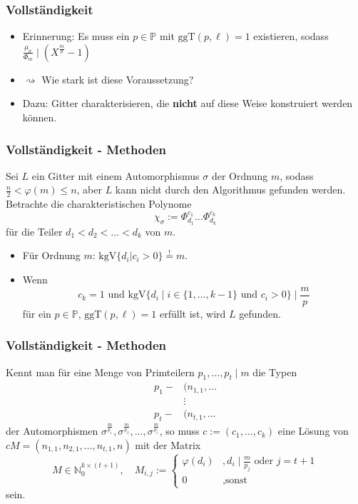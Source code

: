 \documentclass{beamer}
\newcommand{\N}{\mathbb{N}}
\renewcommand{\P}{\mathbb{P}}
\newcommand{\ggT}{\text{ggT}}
\newcommand{\kgV}{\text{kgV}}
\begin{document}
\begin{frame}[plain]
	\frametitle{Vollständigkeit}
	\begin{itemize}
	\item Erinnerung: Es muss ein $p \in \P$ mit $\ggT(p, \ell) = 1$ existieren, sodass $\frac{\mu_\sigma}{\Phi_m} \mid (X^\frac{m}{p} - 1)$\\
	\pause
	\item $\rightsquigarrow$ Wie stark ist diese Voraussetzung?\\
	\pause
	\item Dazu: Gitter charakterisieren, die \textbf{nicht} auf diese Weise konstruiert werden können.
	\end{itemize}
\end{frame}

\begin{frame}[plain]
	\frametitle{Vollständigkeit - Methoden}
	Sei $L$ ein Gitter mit einem Automorphismus $\sigma$ der Ordnung $m$, sodass $\frac{n}{2} < \varphi(m) \leq n$, aber $L$ kann nicht durch den Algorithmus gefunden werden.\\
	\pause
	Betrachte die charakteristischen Polynome
	\[\chi_\sigma := \Phi_{d_1}^{c_1} \dots \Phi_{d_k}^{c_k} \]
	für die Teiler $d_1 < d_2 < \dots < d_k$ von $m$.\\
	\pause
	\begin{itemize}
		\item Für Ordnung $m$: $\kgV\lbrace d_i \vert c_i > 0 \rbrace \stackrel{!}{=} m$.\\
		\pause
		\item Wenn
	 		\[c_k = 1 \text{ und } \kgV \lbrace d_i \mid i \in \lbrace 1, \dots, k-1 \rbrace \text{ und } c_i > 0 \rbrace \mid \frac{m}{p}\]
			für ein $p \in \P$, $\ggT(p, \ell) = 1$ erfüllt ist, wird $L$ gefunden.
	\end{itemize}
\end{frame}

\begin{frame}[plain]
	\frametitle{Vollständigkeit - Methoden}
	Kennt man für eine Menge von Primteilern $p_1, \dots, p_t \mid m$ die Typen
	\begin{align*}
		p_1 - &(n_{1,1}, \dots\\
		&\vdots\\
		p_t - &(n_{t,1}, \dots
	\end{align*}
	der Automorphismen $\sigma^\frac{m}{p_1}, \sigma^\frac{m}{p_2}, \dots, \sigma^\frac{m}{p_t}$, so muss $c := (c_1, \dots, c_k)$ eine Lösung von $c M= (n_{1,1}, n_{2,1}, \dots, n_{t,1}, n)$ mit der Matrix
	\[M \in \N_0^{k \times (t+1)}, \quad M_{i,j} := \begin{cases} \varphi(d_i)	&, d_i \mid \frac{m}{p_j} \text{ oder } j = t+1\\ 0 &, \text{sonst}\end{cases}\]
sein.
\end{frame}
\end{document}
